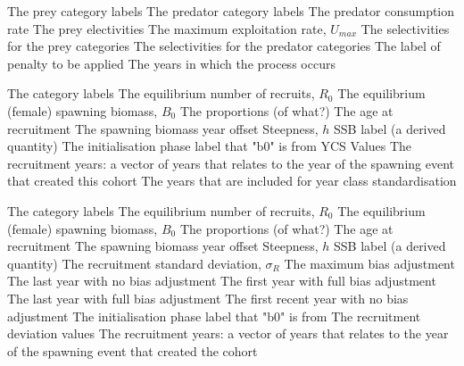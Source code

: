 \par\textbf{}\par
{} {The prey category labels}
 {The predator category labels}
 {The predator consumption rate}
 {The prey electivities}
 {The maximum exploitation rate, $U_{max}$}
 {The selectivities for the prey categories}
 {The selectivities for the predator categories}
 {The label of penalty to be applied}
 {The years in which the process occurs}

\par\textbf{}\par
{} {The category labels}
 {The equilibrium number of recruits, $R_0$}
 {The equilibrium (female) spawning biomass, $B_0$}
 {The proportions (of what?)}
 {The age at recruitment}
 {The spawning biomass year offset}
 {Steepness, $h$}
 {SSB label (a derived quantity)}
 {The initialisation phase label that "b0" is from}
 {YCS Values}
 {The recruitment years: a vector of years that relates to the year of the spawning event that created this cohort}
 {The years that are included for year class standardisation}

\par\textbf{}\par
{} {The category labels}
 {The equilibrium number of recruits, $R_0$}
 {The equilibrium (female) spawning biomass, $B_0$}
 {The proportions (of what?)}
 {The age at recruitment}
 {The spawning biomass year offset}
 {Steepness, $h$}
 {SSB label (a derived quantity)}
 {The recruitment standard deviation, $\sigma_R$}
 {The maximum bias adjustment}
 {The last year with no bias adjustment}
 {The first year with full bias adjustment}
 {The last year with full bias adjustment}
 {The first recent year with no bias adjustment}
 {The initialisation phase label that "b0" is from}
 {The recruitment deviation values}
 {The recruitment years: a vector of years that relates to the year of the spawning event that created the cohort}


